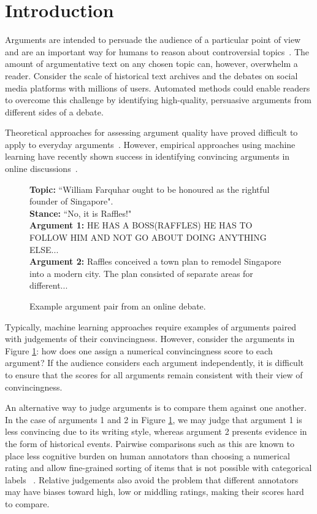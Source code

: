 \section{Introduction}\label{sec:intro}

Arguments are intended to persuade the audience of a particular point of view and 
are an important way for humans to reason about controversial topics~\cite{mercier2011humans}. 
The amount of argumentative text on any chosen topic can, however, overwhelm a reader.
Consider the scale of historical text archives 
and the debates on social media platforms with millions of users.
Automated methods could enable readers to overcome this challenge by identifying high-quality, 
persuasive arguments from different sides of a debate. 

Theoretical approaches for assessing argument quality have proved difficult to apply to everyday arguments~\cite{boudry2015fake}.
However, empirical approaches using machine learning have recently shown success in 
identifying convincing arguments in online discussions~\cite{habernal2016argument}.
\begin{figure}
\textbf{Topic:} ``William Farquhar ought to be honoured as the rightful founder of Singapore". \\
\textbf{Stance:} ``No, it is Raffles!" \\
\textbf{Argument 1:}  
HE HAS A BOSS(RAFFLES) HE HAS TO FOLLOW HIM AND NOT GO ABOUT DOING ANYTHING ELSE... \\
\textbf{Argument 2:} 
Raffles conceived a town plan to remodel Singapore into a modern city. The plan consisted of separate areas for different...
\caption{Example argument pair from an online debate.}
\label{fig:argument_examples}
\end{figure}
Typically, machine learning approaches require examples of arguments paired with judgements of their convincingness.
However, consider the arguments in Figure \ref{fig:argument_examples}:
how does one assign a numerical convincingness score to each argument? 
If the audience considers each argument independently, it is difficult to ensure that the scores for all arguments
remain consistent with their view of convincingness.

An alternative way to judge arguments is to compare them against one another. 
In the case of arguments 1 and 2 in Figure \ref{fig:argument_examples}, we may judge that argument 1 is less convincing due to its writing style, whereas argument 2 
presents evidence in the form of historical events.
Pairwise comparisons such as this are known to place less cognitive burden on human annotators than  
choosing a numerical rating and allow fine-grained sorting of items that is not possible with categorical labels
~\cite{kendall1948rank,kingsley2006preference}.
Relative judgements also avoid the problem that different annotators 
may have biases toward high, low or middling ratings, making their scores hard to compare.

